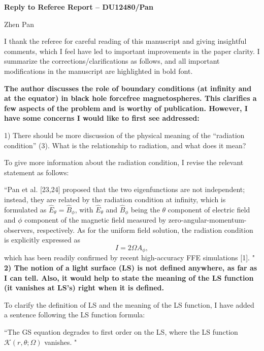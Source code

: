 \documentclass[10pt]{article}
\begin{document}

\begin{center}
{{\large\bf Reply to Referee Report -- DU12480/Pan}}
\end{center}

\begin{center}
{\normalsize Zhen Pan}
\end{center}


I thank the referee for  careful reading of this manuscript and
giving insightful comments, which I feel have led to important improvements in
the paper clarity.
I summarize the corrections/clarifications as follows,
and all important modifications in the manuscript are highlighted in bold font.\\

{\bf The author discusses the role of boundary conditions (at infinity and at the equator) in black hole forcefree
magnetospheres. This clarifies a few aspects of the problem and is worthy of publication.
However, I have some concerns I would like to first see addressed:

1) There should be more discussion of the physical meaning of the “radiation condition” (3). What
is the relationship to radiation, and what does it mean? }

To give more information about the radiation condition, I revise the relevant statement as follows:

``Pan et al. [23,24]  proposed that the two eigenfunctions are not independent;
instead, they are related by the radiation condition at infinity, which is formulated as
$\hat E_\theta = \hat B_\phi$, with $\hat E_\theta$ and $\hat B_\phi$ being the $\theta$
component of electric field and $\phi$ component of the magnetic field measured
by zero-angular-momentum-observers, respectively.
As for the uniform field solution, the radiation condition is explicitly expressed as
\[ I = 2\Omega A_\phi, \]
which has been readily confirmed by recent high-accuracy FFE simulations [1]. " \\


{\bf 2) The notion of a light surface (LS) is not defined anywhere, as far as I can tell. Also, it would help
to state the meaning of the LS function (it vanishes at LS’s) right when it is defined.}

To clarify the definition of LS and the meaning of the LS function, I have added a sentence following the LS function formula:

``The GS equation degrades to first order on the LS, where the LS function $\mathcal K(r,\theta; \Omega )$
vanishes. " \\
\end{document}

